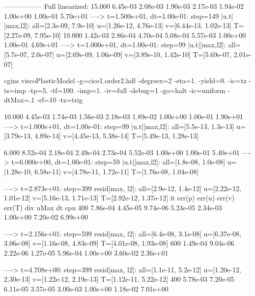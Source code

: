{-----------------
Full linearized:
  15.000 6.45e-03 2.08e-03 1.90e-03 2.17e-03 1.94e-02  1.00e+00 1.00e-01 5.70e+01
 ----> t=1.500e+01, dt=1.00e-01: step=149 |u.t|[max,l2]: all=[2.3e-09, 7.9e-10] u=[1.26e-12, 4.76e-13] v=[6.44e-13, 1.02e-13] T=[2.27e-09, 7.95e-10]
  10.000 1.42e-03 2.86e-04 4.70e-04 5.08e-04 5.57e-03  1.00e+00 1.00e-01 4.69e+01
 ----> t=1.000e+01, dt=1.00e-01: step=99 |u.t|[max,l2]: all=[5.7e-07, 2.0e-07] u=[2.69e-09, 1.06e-09] v=[3.89e-10, 1.42e-10] T=[5.69e-07, 2.01e-07]



cgins viscoPlasticModel -g=cice1.order2.hdf -degreex=2 -eta=1. -yield=0. -ic=tz -ts=imp -tp=5. -tf=100. -imp=1. -iv=full -debug=1 -go=halt -ic=uniform -dtMax=.1 -rf=10 -tz=trig

  10.000 4.45e-03 1.74e-03 1.56e-03 2.18e-03 1.89e-02  1.00e+00 1.00e-01 1.90e+01
 ----> t=1.000e+01, dt=1.00e-01: step=99 |u.t|[max,l2]: all=[5.5e-13, 1.3e-13] u=[3.79e-13, 4.89e-14] v=[4.45e-13, 5.38e-14] T=[5.49e-13, 1.28e-13]


   6.000 8.52e-04 2.18e-04 2.49e-04 2.73e-04 5.52e-03  1.00e+00 1.00e-01 5.40e+01
 ----> t=6.000e+00, dt=1.00e-01: step=59 |u.t|[max,l2]: all=[1.8e-08, 1.0e-08] u=[1.28e-10, 6.58e-11] v=[4.78e-11, 1.72e-11] T=[1.76e-08, 1.04e-08]


----> t=2.873e+01: step=399 resid[max, l2]: all=[2.9e-12, 1.4e-12] u=[2.22e-12, 1.01e-12] v=[5.16e-13, 1.71e-13] T=[2.92e-12, 1.37e-12]
        it   err(p)   err(u)   err(v)   err(T)    div       uMax     dt       cpu
       400 7.86e-04 4.45e-05 9.74e-06 5.24e-05 2.34e-03  1.00e+00 7.20e-02 6.99e+00 

 ----> t=2.156e+01: step=599 resid[max, l2]: all=[6.4e-08, 3.1e-08] u=[6.37e-08, 3.06e-08] v=[1.16e-08, 4.83e-09] T=[4.01e-08, 1.93e-08]
       600 1.49e-04 9.04e-06 2.22e-06 1.27e-05 5.96e-04  1.00e+00 3.60e-02 2.36e+01 



 ----> t=4.708e+00: step=399 resid[max, l2]: all=[1.1e-11, 5.2e-12] u=[1.20e-12, 2.30e-13] v=[1.22e-12, 2.19e-13] T=[1.12e-11, 5.22e-12]
       400 5.78e-03 7.20e-05 6.11e-05 3.57e-05 3.00e-03  1.00e+00 1.18e-02 7.01e+00 

}
